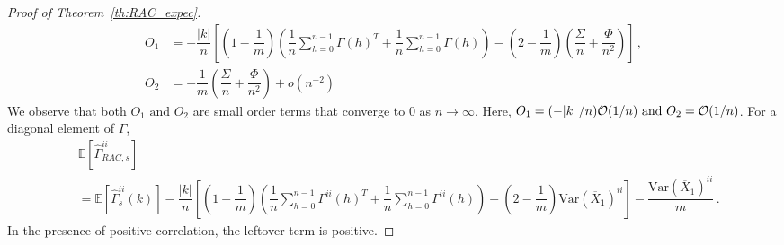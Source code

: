 \documentclass[11pt]{article}
\newcommand{\E}{\mathbb{E}}
\newcommand{\Var}{\text{Var}}
\theoremstyle{remark}
\begin{document}
\begin{proof}[Proof of Theorem~\ref{th:RAC_expec}]
\begin{align*}
    O_1 &= -\dfrac{|k|}{n}\left[\left(1-\dfrac{1}{m}\right)\left(\dfrac{1}{n}\sum_{h=0}^{n-1}\Gamma(h)^T + \dfrac{1}{n}\sum_{h=0}^{n-1}\Gamma(h)\right) - \left(2-\dfrac{1}{m}\right) \left(\dfrac{\Sigma}{n} + \dfrac{\Phi}{n^2}\right)\right] \, ,\\
    O_2 &= -\dfrac{1}{m}\left(\dfrac{\Sigma}{n} + \dfrac{\Phi}{n^2}\right) + o(n^{-2})
\end{align*}
%
We observe that both $O_1 \textrm{ and } O_2$ are small order terms that converge to 0 as $n \to \infty$. Here, $O_1 = (-\abs{k}/n)\mathcal{O}(1/n) \textrm{ and } O_2 = \mathcal{O}(1/n)$. For a diagonal element of $\Gamma$,
%
\begin{align*}
& \E \left[ \hat{\Gamma}_{RAC,s}^{ii}\right]\\
& = \mathbb{E}\left[\hat{\Gamma}^{ii}_{s}(k)\right] - \dfrac{|k|}{n}\left[\left(1-\dfrac{1}{m}\right)\left(\dfrac{1}{n}\sum_{h=0}^{n-1}\Gamma^{ii}(h)^T + \dfrac{1}{n}\sum_{h=0}^{n-1}\Gamma^{ii}(h)\right) - \left(2-\dfrac{1}{m}\right) \Var(\overline{X}_1)^{ii}\right] - \dfrac{\Var(\overline{X}_1)^{ii}}{m}\,.
\end{align*}
In the presence of positive correlation, the leftover term is positive.
\end{proof}
\end{document}
